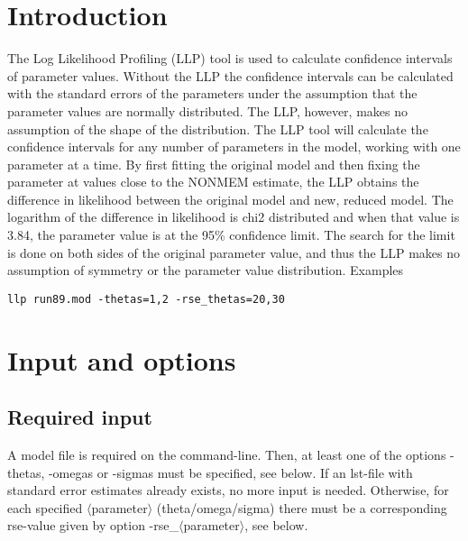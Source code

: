 



\maketitle
\newcommand{\guidetoolname}{llp}


\section{Introduction}
The Log Likelihood Profiling (LLP) tool is used to calculate confidence intervals of parameter values. Without the LLP the confidence intervals can be calculated with the standard errors of the parameters under the assumption that the parameter values are normally distributed. The LLP, however, makes no assumption of the shape of the distribution.
The LLP tool will calculate the confidence intervals for any number of parameters in the model, working with one parameter at a time. By first fitting the original model and then fixing the parameter at values close to the NONMEM estimate, the LLP obtains the difference in likelihood between the original model and new, reduced model. The logarithm of the difference in likelihood is chi2 distributed and when that value is 3.84, the parameter value is at the 95\% confidence limit. The search for the limit is done on both sides of the original parameter value, and thus the LLP makes no assumption of symmetry or the parameter value distribution.
Examples
\begin{verbatim}
llp run89.mod -thetas=1,2 -rse_thetas=20,30
\end{verbatim}

\section{Input and options}

\subsection{Required input}
A model file is required on the command-line. Then, at least one of the options -thetas, -omegas or -sigmas must be specified, see below. If an lst-file with standard error estimates already exists, no more input is needed. Otherwise, for each specified $\langle$parameter$\rangle$ (theta/omega/sigma) there must be a corresponding rse-value given by option -rse\_$\langle$parameter$\rangle$, see below. 

